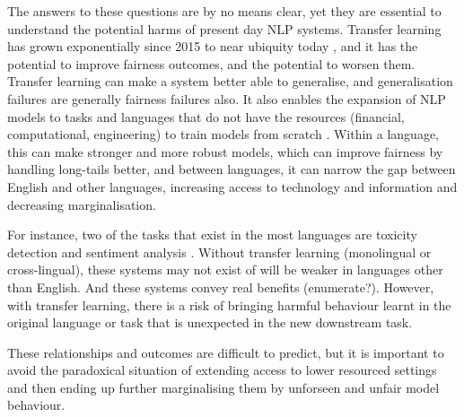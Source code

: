 The answers to these questions are by no means clear, yet they are essential to understand the potential harms of present day NLP systems. Transfer learning has grown exponentially since 2015 \cite{andrew ng talk} to near ubiquity today \cite{}, and it has the potential to improve fairness outcomes, and the potential to worsen them. Transfer learning can make a system better able to generalise, and generalisation failures are generally fairness failures also. It also enables the expansion of NLP models to tasks and languages that do not have the resources (financial, computational, engineering) to train models from scratch \citep{}. Within a language, this can make stronger and more robust models, which can improve fairness by handling long-tails better, and between languages, it can narrow the gap between English and other languages, increasing access to technology and information and decreasing marginalisation.

For instance, two of the tasks that exist in the most languages are toxicity detection \citep{} and sentiment analysis \citep{}. Without transfer learning (monolingual or cross-lingual), these systems may not exist of will be weaker in languages other than English. And these systems convey real benefits (enumerate?). However, with transfer learning, there is a risk of bringing harmful behaviour learnt in the original language or task that is unexpected in the new downstream task.

These relationships and outcomes are difficult to predict, but it is important to avoid the paradoxical situation of extending access to lower resourced settings and then ending up further marginalising them by unforseen and unfair model behaviour.

